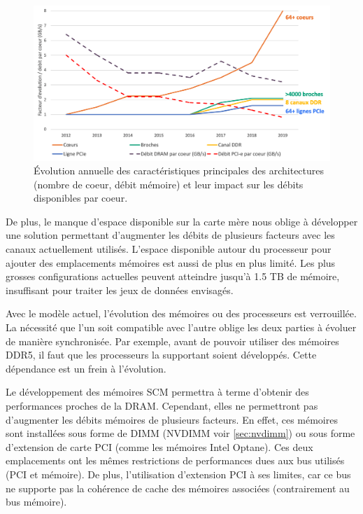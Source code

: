             \begin{figure}
            \center
            \includegraphics[width=14cm]{images/edl_genz_evo_memoire.png}
            \caption{\label{fig:edl_genz_evo_memoire} Évolution annuelle des caractéristiques principales des architectures (nombre de coeur, débit mémoire) et leur impact sur les débits disponibles par coeur.}
            \end{figure}
            
        
        De plus, le manque d'espace disponible sur la carte mère nous oblige à développer une solution permettant d'augmenter les débits de plusieurs facteurs avec les canaux actuellement utilisés. 
        L'espace disponible autour du processeur pour ajouter des emplacements mémoires est aussi de plus en plus limité. Les plus grosses configurations actuelles peuvent atteindre jusqu'à 1.5 TB de mémoire, insuffisant pour traiter les jeux de données envisagés.
    
        Avec le modèle actuel, l'évolution des mémoires ou des processeurs est verrouillée. La nécessité que l'un soit compatible avec l'autre oblige les deux parties à évoluer de manière synchronisée. Par exemple, avant de pouvoir utiliser des mémoires DDR5, il faut que les processeurs la supportant soient développés. Cette dépendance est un frein à l'évolution.
        
        Le développement des mémoires SCM permettra à terme d'obtenir des performances proches de la DRAM. Cependant, elles ne permettront pas d'augmenter les débits mémoires de plusieurs facteurs. En effet, ces mémoires sont installées sous forme de DIMM (NVDIMM voir \autoref{sec:nvdimm}) ou sous forme d'extension de carte PCI (comme les mémoires Intel Optane). Ces deux emplacements ont les mêmes restrictions de performances dues aux bus utilisés (PCI et mémoire). De plus, l'utilisation d'extension PCI à ses limites, car ce bus ne supporte pas la cohérence de cache des mémoires associées (contrairement au bus mémoire).


